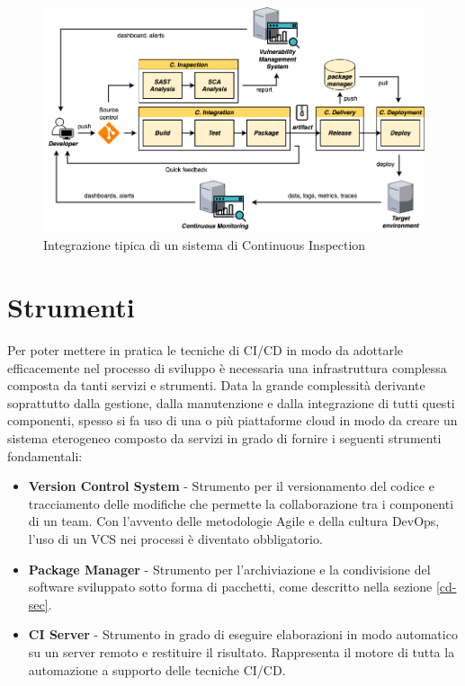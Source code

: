 \begin{figure}[H]
    \centering
    \includegraphics[width=1\textwidth]{img/cinspection-pipeline.png}
    \caption{Integrazione tipica di un sistema di Continuous Inspection}
    \label{ci-inspection-pipeline}
\end{figure}

\section{Strumenti}
\label{devops-tools-sec}
Per poter mettere in pratica le tecniche di CI/CD in modo da adottarle efficacemente nel processo di sviluppo è necessaria una infrastruttura complessa composta da tanti servizi e strumenti. Data la grande complessità derivante soprattutto dalla gestione, dalla manutenzione e dalla integrazione di tutti questi componenti, spesso si fa uso di una o più piattaforme cloud in modo da creare un sistema eterogeneo composto da servizi in grado di fornire i seguenti strumenti fondamentali:
\begin{itemize}
    \item \textbf{Version Control System} - Strumento per il versionamento del codice e tracciamento delle modifiche che permette la collaborazione tra i componenti di un team. Con l'avvento delle metodologie Agile e della cultura DevOps, l'uso di un VCS nei processi è diventato obbligatorio.
    \item \textbf{Package Manager} - Strumento per l'archiviazione e la condivisione del software sviluppato sotto forma di pacchetti, come descritto nella sezione \ref{cd-sec}.
    \item \textbf{CI Server} - Strumento in grado di eseguire elaborazioni in modo automatico su un server remoto e restituire il risultato. Rappresenta il motore di tutta la automazione a supporto delle tecniche CI/CD.
\end{itemize}

